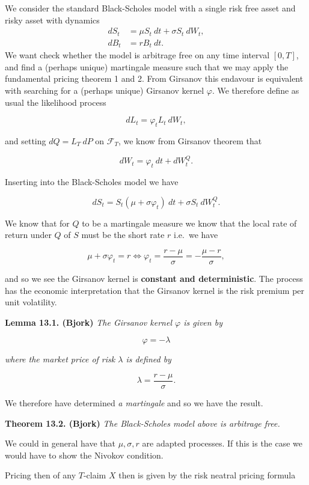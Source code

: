\documentclass[a4paper,12pt,openany]{book}
\begin{document}
We consider the standard Black-Scholes model with a single risk free asset and risky asset with dynamics
\begin{align*}
dS_t &= \mu S_t\ dt+\sigma S_t\ dW_t,\tag{13.1}\\
dB_t &= r B_t\ dt.\tag{13.2}
\end{align*}
We want check whether the model is arbitrage free on any time interval \([0,T]\), and find a (perhaps unique) martingale measure such that we may apply the fundamental pricing theorem 1 and 2. From Girsanov this endavour is equivalent with searching for a (perhaps unique) Girsanov kernel \(\varphi\). We therefore define as usual the likelihood process

\[
dL_t=\varphi_ tL_t\ dW_t,
\]

and setting \(dQ=L_T\ dP\) on \(\mathcal{F}_T\), we know from Girsanov theorem that

\[
dW_t=\varphi_t\ dt+dW_t^Q.
\]

Inserting into the Black-Scholes model we have

\[
dS_t=S_t(\mu + \sigma \varphi_t)\ dt+\sigma S_t\ dW_t^Q.
\]

We know that for \(Q\) to be a martingale measure we know that the local rate of return under \(Q\) of \(S\) must be the short rate \(r\) i.e.~we have

\[
\mu + \sigma \varphi_t=r\iff \varphi_t=\frac{r-\mu}{\sigma}=-\frac{\mu -r}{\sigma},\tag{13.3}
\]

and so we see the Girsanov kernel is \textbf{constant and deterministic}. The process has the economic interpretation that the Girsanov kernel is the risk premium per unit volatility.

\textbf{Lemma 13.1. (Bjork)} \emph{The Girsanov kernel \(\varphi\) is given by}

\[
\varphi = -\lambda
\]

\emph{where the market price of risk \(\lambda\) is defined by}

\[
\lambda =\frac{r-\mu}{\sigma}.
\]

We therefore have determined \emph{a martingale} and so we have the result.

\textbf{Theorem 13.2. (Bjork)} \emph{The Black-Scholes model above is arbitrage free.}

We could in general have that \(\mu,\sigma,r\) are adapted processes. If this is the case we would have to show the Nivokov condition.

Pricing then of any \(T\)-claim \(X\) then is given by the risk neatral pricing formula
\end{document}
